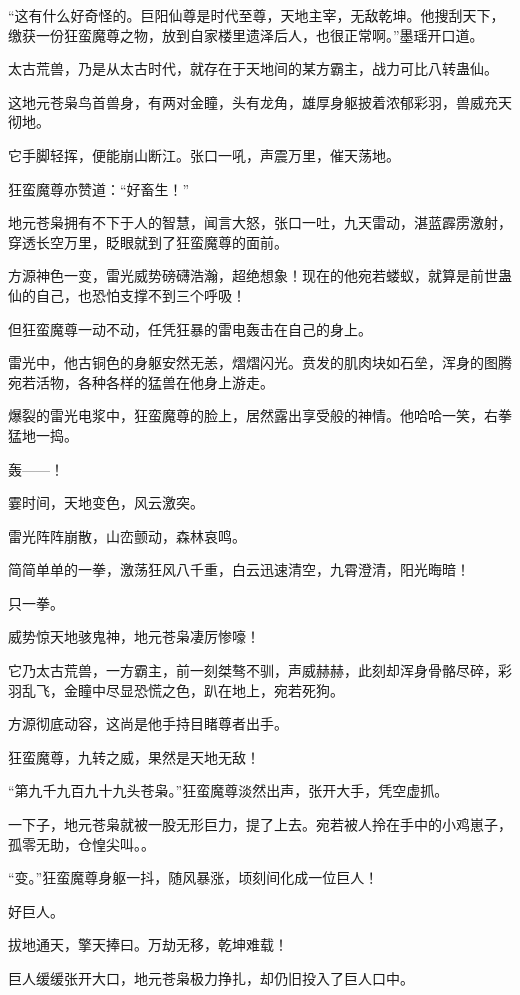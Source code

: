 \begin{this_body}
“这有什么好奇怪的。巨阳仙尊是时代至尊，天地主宰，无敌乾坤。他搜刮天下，缴获一份狂蛮魔尊之物，放到自家楼里遗泽后人，也很正常啊。”墨瑶开口道。

太古荒兽，乃是从太古时代，就存在于天地间的某方霸主，战力可比八转蛊仙。

这地元苍枭鸟首兽身，有两对金瞳，头有龙角，雄厚身躯披着浓郁彩羽，兽威充天彻地。

它手脚轻挥，便能崩山断江。张口一吼，声震万里，催天荡地。

狂蛮魔尊亦赞道：“好畜生！”

地元苍枭拥有不下于人的智慧，闻言大怒，张口一吐，九天雷动，湛蓝霹雳激射，穿透长空万里，眨眼就到了狂蛮魔尊的面前。

方源神色一变，雷光威势磅礴浩瀚，超绝想象！现在的他宛若蝼蚁，就算是前世蛊仙的自己，也恐怕支撑不到三个呼吸！

但狂蛮魔尊一动不动，任凭狂暴的雷电轰击在自己的身上。

雷光中，他古铜色的身躯安然无恙，熠熠闪光。贲发的肌肉块如石垒，浑身的图腾宛若活物，各种各样的猛兽在他身上游走。

爆裂的雷光电浆中，狂蛮魔尊的脸上，居然露出享受般的神情。他哈哈一笑，右拳猛地一捣。

轰——！

霎时间，天地变色，风云激突。

雷光阵阵崩散，山峦颤动，森林哀鸣。

简简单单的一拳，激荡狂风八千重，白云迅速清空，九霄澄清，阳光晦暗！

只一拳。

威势惊天地骇鬼神，地元苍枭凄厉惨嚎！

它乃太古荒兽，一方霸主，前一刻桀骜不驯，声威赫赫，此刻却浑身骨骼尽碎，彩羽乱飞，金瞳中尽显恐慌之色，趴在地上，宛若死狗。

方源彻底动容，这尚是他手持目睹尊者出手。

狂蛮魔尊，九转之威，果然是天地无敌！

“第九千九百九十九头苍枭。”狂蛮魔尊淡然出声，张开大手，凭空虚抓。

一下子，地元苍枭就被一股无形巨力，提了上去。宛若被人拎在手中的小鸡崽子，孤零无助，仓惶尖叫。。

“变。”狂蛮魔尊身躯一抖，随风暴涨，顷刻间化成一位巨人！

好巨人。

拔地通天，擎天捧曰。万劫无移，乾坤难载！

巨人缓缓张开大口，地元苍枭极力挣扎，却仍旧投入了巨人口中。


\end{this_body}
